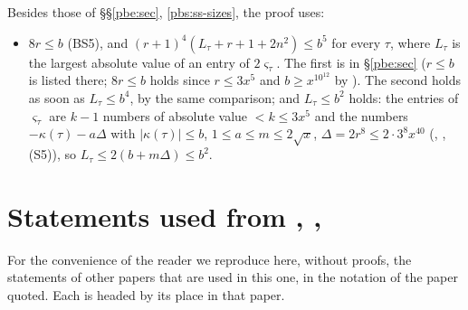 \documentclass[10pt]{amsart}
\theoremstyle{definition}
\theoremstyle{remark}
\begin{document}
Besides those of \S\S\ref{pbe:sec}, \ref{pbs:ss-sizes}, the proof uses:
\begin{itemize}
\item[(Z4)] $8r\le b$ (BS5), and $(r+1)^4(L_\tau+r+1+2n^2)\le b^5$ for every $\tau$, where $L_\tau$ is the
largest absolute value of an entry of $2\varsigma_\tau$. The first is in \S\ref{pbe:sec} ($r\le b$ is listed there;
$8r\le b$ holds since $r\le3x^5$ and $b\ge x^{10^{12}}$ by {\cite[Lemma~13.4]{P46}}). The second holds as soon
as $L_\tau\le b^4$, by the same comparison; and $L_\tau\le b^2$ holds: the entries of $\varsigma_\tau$ are $k-1$ numbers of absolute value $<k\le3x^5$ and
the numbers $-\kappa(\tau)-a\Delta$ with $|\kappa(\tau)|\le b$, $1\le a\le m\le2\sqrt x$, $\Delta=2r^8\le2\cdot3^8x^{40}$
({\cite[\S14.1]{P46}}, {\cite[Lemma~13.4(S2)]{P46}},(S5)), so $L_\tau\le2(b+m\Delta)\le b^2$.
\end{itemize}


\appendix

\section{Statements used from \texorpdfstring{\cite{P46}}{[P46]}, \texorpdfstring{\cite{P49}}{[P49]}, \texorpdfstring{\cite{P52}}{[P52]}}\label{B1:quoted}

For the convenience of the reader we reproduce here, without proofs, the statements of other papers that are used in this one, in the notation of the paper quoted. Each is headed by its place in that paper.
\end{document}
